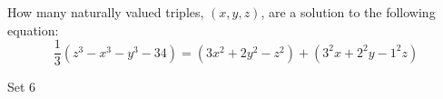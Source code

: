 How many naturally valued triples, $(x, y, z)$, are a solution to the following equation: \[\dfrac{1}{3} ( z^3 - x^3 - y^3 - 34 ) =  (3x^2 + 2y^2 - z^2) +  (3^2x + 2^2y -1^2z)\]



Set 6
